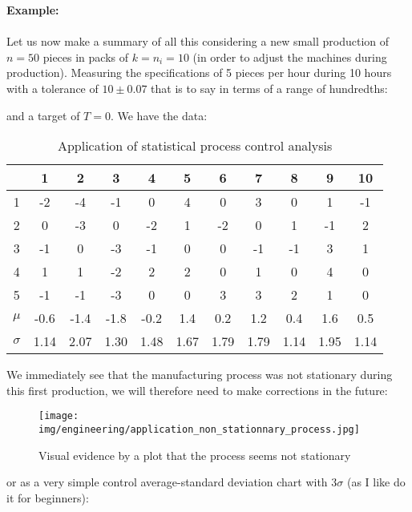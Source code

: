 	\begin{tcolorbox}[colframe=black,colback=white,sharp corners]
	\textbf{{\Large {}}Example:}\\\\
	Let us now make a summary of all this considering a new small production of $n=50$ pieces in packs of $k=n_i=10$ (in order to adjust the machines during production). Measuring the specifications of 5 pieces per hour during 10 hours with a tolerance of $10\pm0.07$ that is to say in terms of a range of hundredths:
	
	and a target of $T=0$. We have the data:
	\begin{table}[H]
	\begin{center}
	\begin{tabular}{|c|c|c|c|c|c|c|c|c|c|c|}
	\hline 
	{} & {\cellcolor{black!30}1} & {\cellcolor{black!30}2} & {\cellcolor{black!30}3} & {\cellcolor{black!30}4} & {\cellcolor{black!30}5} & {\cellcolor{black!30}6} & {\cellcolor{black!30}7} & {\cellcolor{black!30}8} & {\cellcolor{black!30}9} & {\cellcolor{black!30}10} \\ 
	\hline 
	{\cellcolor{black!30}1} & -2 & -4 & -1 & 0 & 4 & 0 & 3 & 0 & 1 & -1  \\ 
	\hline 
	{\cellcolor{black!30}2} & 0 & -3 & 0 & -2 & 1 & -2 & 0 & 1 & -1 & 2  \\ 
	\hline 
	{\cellcolor{black!30}3} & -1 & 0 & -3 & -1 & 0 & 0 & -1 & -1 & 3 & 1  \\ 
	\hline 
	{\cellcolor{black!30}4} & 1 & 1 & -2 & 2 & 2 & 0 & 1 & 0 & 4 & 0  \\ 
	\hline 
	{\cellcolor{black!30}5} & -1 & -1 & -3 & 0 & 0 & 3 & 3 & 2 & 1 & 0  \\ 
	\hline 
	{\cellcolor{black!30}$\mu$} & -0.6 & -1.4 & -1.8 & -0.2 & 1.4 & 0.2 & 1.2 & 0.4 & 1.6 & 0.5  \\ 
	\hline 
	{\cellcolor{black!30}$\sigma$} & 1.14 & 2.07 & 1.30 & 1.48 & 1.67 & 1.79 & 1.79 & 1.14 & 1.95 & 1.14  \\ 
	\hline 
	\end{tabular} 
	\end{center}
	\caption{Application of statistical process control analysis}
	\end{table}
	We immediately see that the manufacturing process was not stationary during this first production, we will therefore need to make corrections in the future:
	\begin{figure}[H]
		\centering
		\texttt{[image: img/engineering/application\_non\_stationnary\_process.jpg]}
		\caption[]{Visual evidence by a plot that the process seems not stationary}
	\end{figure}
	or as a very simple control average-standard deviation chart with $3\sigma$ (as I like do it for beginners):
	\end{tcolorbox}
	
